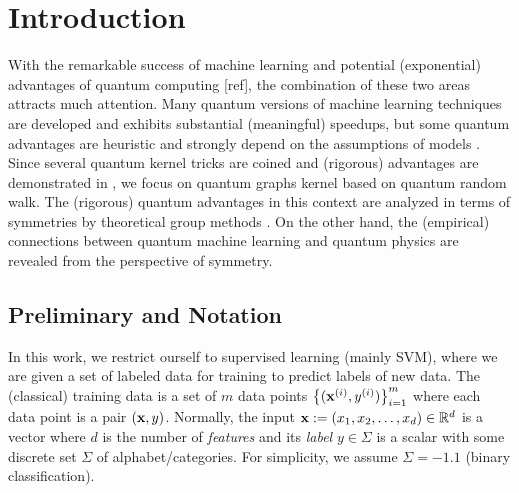 
\section{Introduction}
With the remarkable success of machine learning and potential (exponential) advantages of quantum computing [ref], the combination of these two areas attracts much attention.
Many quantum versions of machine learning techniques \cite{rebentrostQuantumSupportVector2014} \cite{lloydQuantumPrincipalComponent2014} \cite{congQuantumConvolutionalNeural2019} are developed and exhibits substantial (meaningful) speedups,
but some quantum advantages are heuristic and strongly depend on the assumptions of models \cite{tangQuantumPrincipalComponent2021}.
Since several quantum kernel tricks are coined \cite{havlicekSupervisedLearningQuantum2019} \cite{schuldQuantumMachineLearning2019} and (rigorous) advantages are demonstrated in \cite{glickCovariantQuantumKernels2021} \cite{liuRigorousRobustQuantum2021},
we focus on quantum graphs kernel based on quantum random walk. 
The (rigorous) quantum advantages in this context are analyzed in terms of symmetries by theoretical group methods \cite{kondorGroupTheoreticalMethods2008} \cite{ben-davidSymmetriesGraphProperties2020}.
On the other hand, the (empirical) connections between quantum machine learning  and quantum physics are revealed from the perspective of symmetry.


\subsection{Preliminary and Notation}
In this work, we restrict ourself to supervised learning (mainly SVM), where we are given a set of labeled data for training to predict labels of new data.
The (classical) training data is a set of $m$ data points $\qty{(\vb{x}^{(i)}, y^{(i)})}^{m}_{i=1}$ 
where each data point is a pair $(\vb{x},y)$.
Normally, the input $\vb{x}:= (x_1,x_2,\dots,x_d) \in \mathbb{R}^d$  is a vector where $d$ is the number of \emph{features}
and its \emph{label} $y\in\Sigma$ is a scalar with some discrete set $\Sigma$ of alphabet/categories. 
For simplicity, we assume $\Sigma=\qty{-1,1}$ (binary classification).

